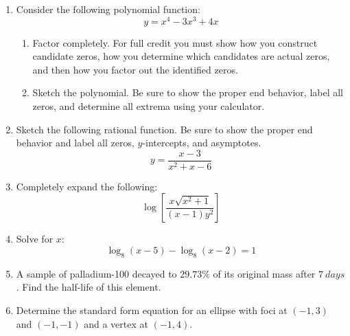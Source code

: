 \documentclass[letterpaper,12pt,fleqn]{article}
\begin{document}
\begin{enumerate}
\begin{enumerate}
  \end{enumerate}

\item Consider the following polynomial function:
  \[y=x^4-3x^3+4x\]
  \begin{enumerate}
  \item Factor completely. For full credit you must show how you construct
    candidate zeros, how you determine which candidates are actual zeros, and
    then how you factor out the identified zeros.

    \vspace{4in}

  \item Sketch the polynomial. Be sure to show the proper end behavior,
    label all zeros, and determine all extrema using your calculator.
  
  \end{enumerate}

\item Sketch the following rational function. Be sure to show the proper
  end behavior and label all zeros, $y$-intercepts, and asymptotes.
  \[y=\frac{x-3}{x^2+x-6}\]


\item Completely expand the following:
  \[\log\left[\frac{x\sqrt{x^2+1}}{(x-1)y^2}\right]\]

  \newpage

\item Solve for $x$:
  \[\log_8(x-5)-\log_8(x-2)=1\]

  \vspace{3.5in}

\item A sample of palladium-100 decayed to $29.73\%$ of its original mass after
  $\SI{7}{days}$. Find the half-life of this element.

  \newpage

\item Determine the standard form equation for an ellipse with foci at
  $(-1,3)$ and $(-1,-1)$ and a vertex at $(-1,4)$.


\end{enumerate}
\end{document}
